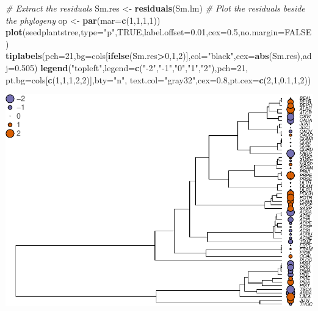 \documentclass[
]{book}
\newenvironment{Shaded}{\begin{snugshade}}{\end{snugshade}}
\newcommand{\AttributeTok}[1]{\textcolor[rgb]{0.13,0.29,0.53}{#1}}
\newcommand{\CommentTok}[1]{\textcolor[rgb]{0.56,0.35,0.01}{\textit{#1}}}
\newcommand{\ConstantTok}[1]{\textcolor[rgb]{0.56,0.35,0.01}{#1}}
\newcommand{\DecValTok}[1]{\textcolor[rgb]{0.00,0.00,0.81}{#1}}
\newcommand{\FloatTok}[1]{\textcolor[rgb]{0.00,0.00,0.81}{#1}}
\newcommand{\FunctionTok}[1]{\textcolor[rgb]{0.13,0.29,0.53}{\textbf{#1}}}
\newcommand{\NormalTok}[1]{#1}
\newcommand{\OtherTok}[1]{\textcolor[rgb]{0.56,0.35,0.01}{#1}}
\newcommand{\SpecialCharTok}[1]{\textcolor[rgb]{0.81,0.36,0.00}{\textbf{#1}}}
\newcommand{\StringTok}[1]{\textcolor[rgb]{0.31,0.60,0.02}{#1}}
\begin{document}
\begin{Shaded}
\begin{Highlighting}[]
\CommentTok{\# Extract the residuals}
\NormalTok{Sm.res }\OtherTok{\textless{}{-}} \FunctionTok{residuals}\NormalTok{(Sm.lm)}
\CommentTok{\# Plot the residuals beside the phylogeny}
\NormalTok{op }\OtherTok{\textless{}{-}} \FunctionTok{par}\NormalTok{(}\AttributeTok{mar=}\FunctionTok{c}\NormalTok{(}\DecValTok{1}\NormalTok{,}\DecValTok{1}\NormalTok{,}\DecValTok{1}\NormalTok{,}\DecValTok{1}\NormalTok{))}
\FunctionTok{plot}\NormalTok{(seedplantstree,}\AttributeTok{type=}\StringTok{"p"}\NormalTok{,}\ConstantTok{TRUE}\NormalTok{,}\AttributeTok{label.offset=}\FloatTok{0.01}\NormalTok{,}\AttributeTok{cex=}\FloatTok{0.5}\NormalTok{,}\AttributeTok{no.margin=}\ConstantTok{FALSE}\NormalTok{)}
\FunctionTok{tiplabels}\NormalTok{(}\AttributeTok{pch=}\DecValTok{21}\NormalTok{,}\AttributeTok{bg=}\NormalTok{cols[}\FunctionTok{ifelse}\NormalTok{(Sm.res}\SpecialCharTok{\textgreater{}}\DecValTok{0}\NormalTok{,}\DecValTok{1}\NormalTok{,}\DecValTok{2}\NormalTok{)],}\AttributeTok{col=}\StringTok{"black"}\NormalTok{,}\AttributeTok{cex=}\FunctionTok{abs}\NormalTok{(Sm.res),}\AttributeTok{adj=}\FloatTok{0.505}\NormalTok{)}
\FunctionTok{legend}\NormalTok{(}\StringTok{"topleft"}\NormalTok{,}\AttributeTok{legend=}\FunctionTok{c}\NormalTok{(}\StringTok{"{-}2"}\NormalTok{,}\StringTok{"{-}1"}\NormalTok{,}\StringTok{"0"}\NormalTok{,}\StringTok{"1"}\NormalTok{,}\StringTok{"2"}\NormalTok{),}\AttributeTok{pch=}\DecValTok{21}\NormalTok{,}
       \AttributeTok{pt.bg=}\NormalTok{cols[}\FunctionTok{c}\NormalTok{(}\DecValTok{1}\NormalTok{,}\DecValTok{1}\NormalTok{,}\DecValTok{1}\NormalTok{,}\DecValTok{2}\NormalTok{,}\DecValTok{2}\NormalTok{)],}\AttributeTok{bty=}\StringTok{"n"}\NormalTok{,}
       \AttributeTok{text.col=}\StringTok{"gray32"}\NormalTok{,}\AttributeTok{cex=}\FloatTok{0.8}\NormalTok{,}\AttributeTok{pt.cex=}\FunctionTok{c}\NormalTok{(}\DecValTok{2}\NormalTok{,}\DecValTok{1}\NormalTok{,}\FloatTok{0.1}\NormalTok{,}\DecValTok{1}\NormalTok{,}\DecValTok{2}\NormalTok{))}
\end{Highlighting}
\end{Shaded}

\includegraphics{pcm-workshop_files/figure-latex/Challenge 1 - solution-1.pdf}
\end{document}
